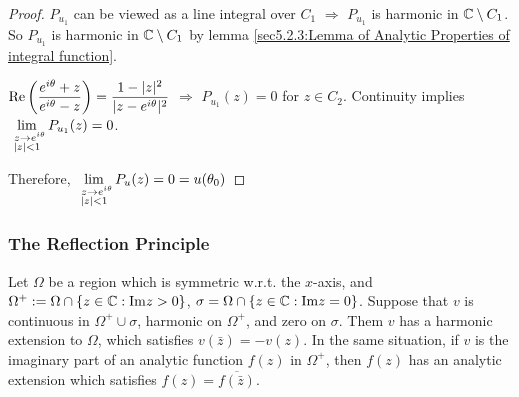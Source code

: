 \begin{proof}
     $ P_{u_1} $ can be viewed as a line integral over  $ C_1 $  $ \Rightarrow $  $ P_{u_1} $ is harmonic in  $ \mathbb C\setminus C_1 $. So  $ P_{u_1} $ is harmonic in  $ \mathbb C\setminus C_1 $ by lemma \ref{sec5.2.3:Lemma of Analytic Properties of integral function}.

    $ \displaystyle\mathrm{Re}\left(\frac{e^{i\theta}+z}{e^{i\theta}-z}\right)=\frac{1-|z|^2}{|z-e^{i\theta}|^2} $  $ \Rightarrow  $  $ P_{u_1}(z)=0 $ for  $ z\in C_2 $. Continuity  implies  $ \displaystyle \lim_{\substack{\,\,\,z\to e^{i\theta}\\|z|<1}} P_{u_1}(z)=0$.

    Therefore,  $ \displaystyle \lim_{\substack{\,\,\,z\to e^{i\theta}\\|z|<1}} P_{u}(z)=0=u(\theta_0) $ 
\end{proof}
\subsubsection{The Reflection Principle}
\begin{theorem}\label{thm:5.6.5:The reflection principle}
    Let  $ \Omega  $ be a region which is symmetric w.r.t. the  $ x $-axis, and  $ \Omega^+:=\Omega\cap\{z\in \mathbb C:\mathrm{Im} z>0\} $,  $ \sigma=\Omega\cap\{z\in \mathbb C:\mathrm{Im} z=0\} $. Suppose that  $  v  $ is continuous in  $ \Omega^+\cup\sigma $, harmonic on  $ \Omega^+ $, and  zero on  $ \sigma $. Them  $ v  $ has a harmonic extension to  $ \Omega $, which satisfies  $ v(\bar{z})=-v(z) $. In the same situation, if   $ v  $ is the imaginary part of an analytic function  $ f(z) $ in  $ \Omega^+ $, then  $ f(z)  $ has an analytic extension  which satisfies  $ f(z)=\overline{f(\bar{z})} $. 
\end{theorem}
